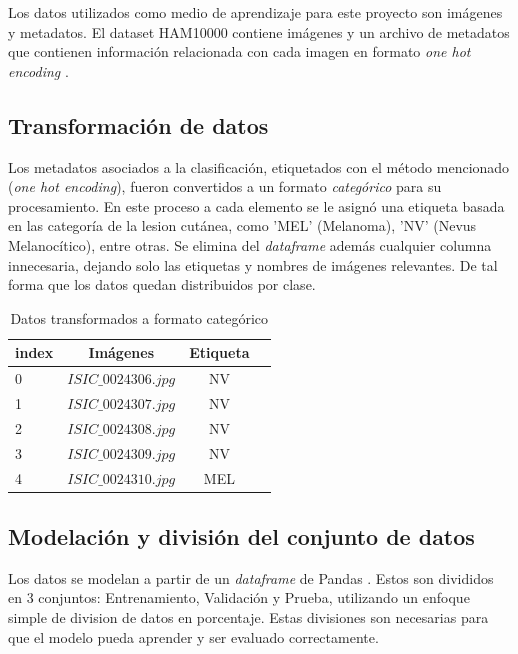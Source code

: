 Los datos utilizados como medio de aprendizaje para este proyecto son imágenes y metadatos. El dataset HAM10000 contiene imágenes y un archivo de metadatos que contienen información relacionada con cada imagen en formato \textit{one hot encoding} .

\subsection{Transformación de datos}

Los metadatos asociados a la clasificación, etiquetados con el método mencionado (\textit{one hot encoding}), fueron convertidos a un formato \textit{categórico}  para su procesamiento. En este proceso a cada elemento se le asignó una etiqueta basada en las categoría de la lesion cutánea, como 'MEL' (Melanoma), 'NV' (Nevus Melanocítico), entre otras. Se elimina del \textit{dataframe} además cualquier columna innecesaria, dejando solo las etiquetas y nombres de imágenes relevantes. De tal forma que los datos quedan distribuidos por clase.

\begin{table}[ht]
   \centering
   \begin{tabular}{lccc}
   \hline
   \textbf{index} & \textbf{Imágenes} & \textbf{Etiqueta} \\
   \hline
      0 & $ISIC\_0024306.jpg$ & NV \\
      1 & $ISIC\_0024307.jpg$ & NV \\
      2 & $ISIC\_0024308.jpg$ & NV \\
      3 & $ISIC\_0024309.jpg$ & NV \\
      4 & $ISIC\_0024310.jpg$ & MEL \\
   \hline
   \end{tabular}
   \caption{Datos transformados a formato categórico}
   \label{}
\end{table}   

\subsection{Modelación y división del conjunto de datos}

Los datos se modelan a partir de un \textit{dataframe} de Pandas . Estos son divididos en 3 conjuntos: Entrenamiento, Validación y Prueba, utilizando un enfoque simple de division de datos en porcentaje. Estas divisiones son necesarias para que el modelo pueda aprender y ser evaluado correctamente.

